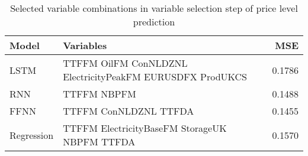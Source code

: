 \begin{table}[h!]
\centering
 \begin{adjustbox}{max width=\textwidth}
\begin{tabular}{llr}
  \hline
Model & Variables & MSE \\ 
  \hline
LSTM & TTFFM OilFM ConNLDZNL ElectricityPeakFM EURUSDFX ProdUKCS & 0.1786 \\ 
  RNN & TTFFM NBPFM & 0.1488 \\ 
  FFNN & TTFFM ConNLDZNL TTFDA & 0.1455 \\ 
  Regression & TTFFM ElectricityBaseFM StorageUK NBPFM TTFDA & 0.1570 \\ 
   \hline
 \end{tabular}
\end{adjustbox}
\caption{Selected variable combinations in variable selection step of price level prediction} 
\label{tab:level.var.selection.short}
\end{table}

